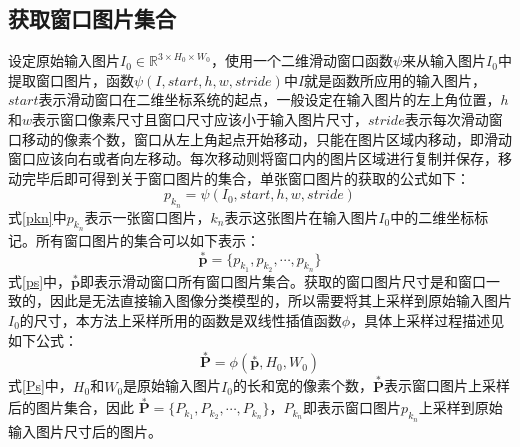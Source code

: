 \subsection{获取窗口图片集合}
设定原始输入图片$I_0 \in \mathbb{R}^{3\times H_0 \times W_0}$，使用一个二维滑动窗口函数$\psi$来从输入图片$I_0$中提取窗口图片，函数$\psi(I, start, h, w, stride)$中$I$就是函数所应用的输入图片，$start$表示滑动窗口在二维坐标系统的起点，一般设定在输入图片的左上角位置，$h$和$w$表示窗口像素尺寸且窗口尺寸应该小于输入图片尺寸，$stride$表示每次滑动窗口移动的像素个数，窗口从左上角起点开始移动，只能在图片区域内移动，即滑动窗口应该向右或者向左移动。每次移动则将窗口内的图片区域进行复制并保存，移动完毕后即可得到关于窗口图片的集合，单张窗口图片的获取的公式如下：
\begin{equation}
	p_{k_n}=\psi(I_0,start,h,w,stride)
	\label{pkn}
\end{equation}
式\ref{pkn}中$p_{k_n}$表示一张窗口图片，$k_n$表示这张图片在输入图片$I_0$中的二维坐标标记。所有窗口图片的集合可以如下表示：
\begin{equation}
	\overset{*}{\bm{p}}=\{p_{k_1},p_{k_2},\cdots,p_{k_n}\}
\label{ps}
\end{equation}
式\ref{ps}中，$\overset{*}{\bm{p}}$即表示滑动窗口所有窗口图片集合。获取的窗口图片尺寸是和窗口一致的，因此是无法直接输入图像分类模型的，所以需要将其上采样到原始输入图片$I_0$的尺寸，本方法上采样所用的函数是双线性插值函数$\phi$，具体上采样过程描述见如下公式：
\begin{equation}
	\overset{*}{\bm{P}}=\phi(\overset{*}{\bm{p}},H_0,W_0) 
\label{Ps}
\end{equation}
式\ref{Ps}中，$H_0$和$W_0$是原始输入图片$I_0$的长和宽的像素个数，$\overset{*}{\bm{P}}$表示窗口图片上采样后的图片集合，因此 $\overset{*}{\bm{P}}=\{P_{k_1},P_{k_2},\cdots,P_{k_n}\}$，$P_{k_n}$即表示窗口图片$p_{k_n}$上采样到原始输入图片尺寸后的图片。

